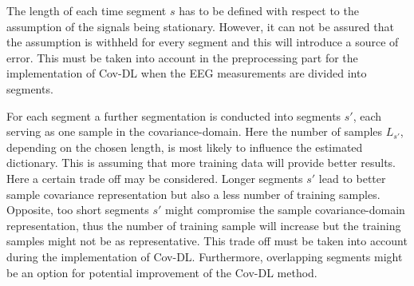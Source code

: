 The length of each time segment $s$ has to be defined with respect to the assumption of the signals being stationary. However, it can not be assured that the assumption is withheld for every segment and this will introduce a source of error. 
This must be taken into account in the preprocessing part for the implementation of Cov-DL when the EEG measurements are divided into segments.

For each segment a further segmentation is conducted into segments $s'$, each serving as one sample in the covariance-domain. Here the number of samples $L_{s'}$, depending on the chosen length, is most likely to influence the estimated dictionary. This is assuming that more training data will provide better results. Here a certain trade off may be considered. Longer segments $s'$ lead to better sample covariance representation but also a less number of training samples. Opposite, too short segments $s'$ might compromise the sample covariance-domain representation, thus the number of training sample will increase but the training samples might not be as representative. 
This trade off must be taken into account during the implementation of Cov-DL. 
Furthermore, overlapping segments might be an option for potential improvement of the Cov-DL method.